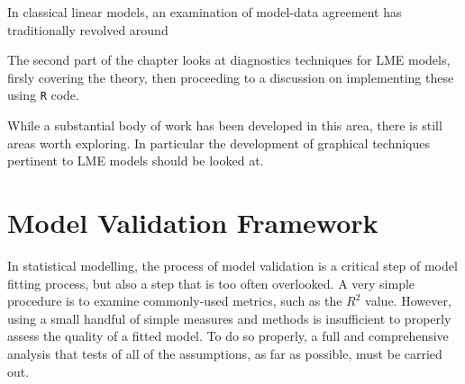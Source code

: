 \documentclass[12pt, a4paper]{article}
\begin{document}
In classical linear models, an examination of model-data agreement has traditionally revolved around

The second part of the chapter looks at diagnostics techniques for LME models, firsly covering the theory, then proceeding to a discussion on 
implementing these using \texttt{R} code.

While a substantial body of work has been developed in this area, there is still areas worth exploring. 
In particular the development of graphical techniques pertinent to LME models should be looked at.




%
%
%
%










\newpage
\section{Model Validation Framework}
In statistical modelling, the process of model validation is a critical step of model fitting process, but also a step that is too often overlooked. A very simple procedure is to examine commonly-used
metrics, such as the $R^2$ value. However, using a small handful of simple measures and methods is insufficient to properly assess the quality of a fitted model. To do so properly, a full and comprehensive
analysis that tests of all of the assumptions, as far as possible, must be carried out.
\end{document}
